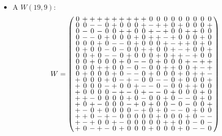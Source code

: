 \documentclass{beamer}
\begin{document}
\begin{frame}

  \begin{itemize}
  \item A $W(19,9)$:
    \[
      W=
      \arraycolsep=1.25pt\def\arraystretch{0.625}
      \left(
        \begin{array}{ccccccccccccccccccc}
          0&+&+&+&+&+&+&+&+&+&0&0&0&0&0&0&0&0&0\\
          0&0&-&-&0&+&0&0&0&+&-&+&+&0&+&0&0&0&+\\
          0&-&0&-&0&0&+&+&0&0&+&-&+&0&0&+&+&0&0\\
          0&-&-&0&+&0&0&0&+&0&+&+&-&+&0&0&0&+&0\\
          0&0&0&+&0&-&-&0&+&0&0&0&+&-&+&+&0&+&0\\
          0&+&0&0&-&0&-&0&0&+&+&0&0&+&-&+&0&0&+\\
          0&0&+&0&-&-&0&+&0&0&0&+&0&+&+&-&+&0&0\\
          0&0&+&0&0&0&+&0&-&-&0&+&0&0&0&+&-&+&+\\
          0&0&0&+&+&0&0&-&0&-&0&0&+&+&0&0&+&-&+\\
          0&+&0&0&0&+&0&-&-&0&+&0&0&0&+&0&+&+&-\\
          +&0&0&0&+&0&-&+&-&0&0&-&-&0&+&0&0&0&+\\
          +&0&0&0&-&+&0&0&+&-&-&0&-&0&0&+&+&0&0\\
          +&0&0&0&0&-&+&-&0&+&-&-&0&+&0&0&0&+&0\\
          +&+&-&0&0&0&0&+&0&-&0&0&+&0&-&-&0&+&0\\
          +&0&+&-&0&0&0&-&+&0&+&0&0&-&0&-&0&0&+\\
          +&-&0&+&0&0&0&0&-&+&0&+&0&-&-&0&+&0&0\\
          +&+&0&-&+&-&0&0&0&0&0&+&0&0&0&+&0&-&-\\
          +&-&+&0&0&+&-&0&0&0&0&0&+&+&0&0&-&0&-\\
          +&0&-&+&-&0&+&0&0&0&+&0&0&0&+&0&-&-&0\\
        \end{array}
      \right)
    \]
  \end{itemize}

\end{frame}
\end{document}
